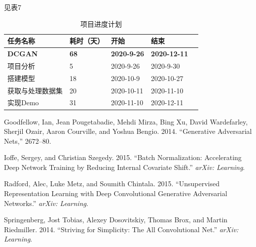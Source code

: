 \documentclass[hyperref, a4paper]{ctexart}
\begin{document}
见表7

\begin{table}
    \caption{项目进度计划}
    \centering
    \begin{tabular}{|p{2.0cm}<{\centering}|p{1.0cm}<{\centering}|p{2.0cm}<{\centering}|p{2.0cm}<{\centering}|p{2.0cm}<{\centering}|}
    \hline
    任务名称     & 耗时（天） & 开始         & 结束         \\ \hline
    \textbf{DCGAN}    & \textbf{68}    & \textbf{2020-9-26}  & \textbf{2020-12-11} \\ \hline
    项目分析     & 5     & 2020-9-26  & 2020-9-30  \\ \hline
    搭建模型     & 18     & 2020-10-9  & 2020-10-27 \\ \hline
    获取与处理数据集 & 20     & 2020-10-11 & 2020-11-10 \\ \hline
    实现Demo   & 31    & 2020-11-10 & 2020-12-11 \\ \hline
    \end{tabular}
\end{table}

\hypertarget{refs}{}
\leavevmode\hypertarget{ref-goodfellow2014generative}{}%
Goodfellow, Ian, Jean Pougetabadie, Mehdi Mirza, Bing Xu, David
Wardefarley, Sherjil Ozair, Aaron Courville, and Yoshua Bengio. 2014.
``Generative Adversarial Nets,'' 2672--80.

\leavevmode\hypertarget{ref-ioffe2015batch}{}%
Ioffe, Sergey, and Christian Szegedy. 2015. ``Batch Normalization:
Accelerating Deep Network Training by Reducing Internal Covariate
Shift.'' \emph{arXiv: Learning}.

\leavevmode\hypertarget{ref-radford2015unsupervised}{}%
Radford, Alec, Luke Metz, and Soumith Chintala. 2015. ``Unsupervised
Representation Learning with Deep Convolutional Generative Adversarial
Networks.'' \emph{arXiv: Learning}.

\leavevmode\hypertarget{ref-springenberg2014striving}{}%
Springenberg, Jost Tobias, Alexey Dosovitskiy, Thomas Brox, and Martin
Riedmiller. 2014. ``Striving for Simplicity: The All Convolutional
Net.'' \emph{arXiv: Learning}.
\end{document}
